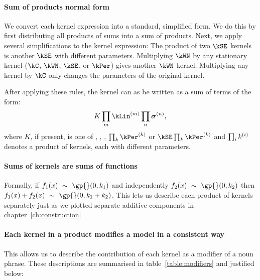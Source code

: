\paragraph{Sum of products normal form} 

We convert each kernel expression into a standard, simplified form.
We do this by first distributing all products of sums into a sum of products.
Next, we apply several simplifications to the kernel expression:
The product of two $\kSE$ kernels is another $\kSE$ with different parameters. Multiplying $\kWN$ by any stationary kernel ($\kC$, $\kWN$, $\kSE$, or $\kPer$) gives another $\kWN$ kernel. Multiplying any kernel by $\kC$ only changes the parameters of the original kernel.

After applying these rules, the kernel can as be written as a sum of terms of the form:
\begin{align*}
K \prod_m \kLin^{(m)} \prod_n \boldsymbol\sigma^{(n)},
\label{eq:sop}
\end{align*}
where $K$, if present, is one of \kWN, \kC, \kSE, $\prod_k \kPer^{(k)}$ or $\kSE \prod_k \kPer^{(k)}$
and $\prod_ik^{(i)}$ denotes a product of kernels, each with different parameters.


\paragraph{Sums of kernels are sums of functions}
Formally, if $f_1(x) \dist \gp{}(0, \kernel_1)$ and independently $f_2(x) \dist \gp{}(0, \kernel_2)$ then ${f_1(x) + f_2(x) \dist \gp{}(0, \kernel_1 + \kernel_2)}$.
This lets us describe each product of kernels separately just as we plotted separate additive components in chapter~\ref{ch:construction}

\paragraph{Each kernel in a product modifies a model in a consistent way}
This allows us to describe the contribution of each kernel as a modifier of a noun phrase.
These descriptions are summarised in table~\ref{table:modifiers} and justified below:

